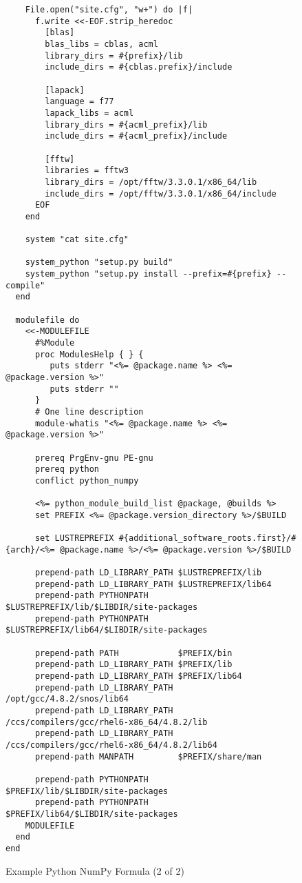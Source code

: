 \documentclass{acm_proc_article-sp}
\begin{document}
\begin{figure*}
\begin{verbatim}
    File.open("site.cfg", "w+") do |f|
      f.write <<-EOF.strip_heredoc
        [blas]
        blas_libs = cblas, acml
        library_dirs = #{prefix}/lib
        include_dirs = #{cblas.prefix}/include

        [lapack]
        language = f77
        lapack_libs = acml
        library_dirs = #{acml_prefix}/lib
        include_dirs = #{acml_prefix}/include

        [fftw]
        libraries = fftw3
        library_dirs = /opt/fftw/3.3.0.1/x86_64/lib
        include_dirs = /opt/fftw/3.3.0.1/x86_64/include
      EOF
    end

    system "cat site.cfg"

    system_python "setup.py build"
    system_python "setup.py install --prefix=#{prefix} --compile"
  end

  modulefile do
    <<-MODULEFILE
      #%Module
      proc ModulesHelp { } {
         puts stderr "<%= @package.name %> <%= @package.version %>"
         puts stderr ""
      }
      # One line description
      module-whatis "<%= @package.name %> <%= @package.version %>"

      prereq PrgEnv-gnu PE-gnu
      prereq python
      conflict python_numpy

      <%= python_module_build_list @package, @builds %>
      set PREFIX <%= @package.version_directory %>/$BUILD

      set LUSTREPREFIX #{additional_software_roots.first}/#{arch}/<%= @package.name %>/<%= @package.version %>/$BUILD

      prepend-path LD_LIBRARY_PATH $LUSTREPREFIX/lib
      prepend-path LD_LIBRARY_PATH $LUSTREPREFIX/lib64
      prepend-path PYTHONPATH      $LUSTREPREFIX/lib/$LIBDIR/site-packages
      prepend-path PYTHONPATH      $LUSTREPREFIX/lib64/$LIBDIR/site-packages

      prepend-path PATH            $PREFIX/bin
      prepend-path LD_LIBRARY_PATH $PREFIX/lib
      prepend-path LD_LIBRARY_PATH $PREFIX/lib64
      prepend-path LD_LIBRARY_PATH /opt/gcc/4.8.2/snos/lib64
      prepend-path LD_LIBRARY_PATH /ccs/compilers/gcc/rhel6-x86_64/4.8.2/lib
      prepend-path LD_LIBRARY_PATH /ccs/compilers/gcc/rhel6-x86_64/4.8.2/lib64
      prepend-path MANPATH         $PREFIX/share/man

      prepend-path PYTHONPATH      $PREFIX/lib/$LIBDIR/site-packages
      prepend-path PYTHONPATH      $PREFIX/lib64/$LIBDIR/site-packages
    MODULEFILE
  end
end
\end{verbatim}
\label{fig:PythonNumpyFormula2}
\caption{Example Python NumPy Formula (2 of 2)}
\end{figure*}
\end{document}
